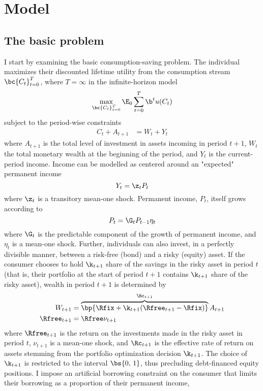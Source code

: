 \section{Model}\label{model}

\subsection{The basic problem}

I start by examining the basic consumption-saving problem. The individual maximizes their discounted lifetime utility from the consumption stream $\bc{C_{t}}_{t=0}^{T}$, where $T = \infty$ in the infinite-horizon model
\begin{equation}\label{eq:prb}
   \max_{\bc{C_t}_{t=0}^{T}}\E_{0}\sum_{t=0}^{T}\b^t u(C_t)
\end{equation}
subject to the period-wise constraints
\begin{align*}
    C_{t} + A_{t+1} &= W_{t} + Y_{t}
\end{align*}
where $A_{t+1}$ is the total level of investment in assets incoming in period $t+1$, $W_{t}$ the total monetary wealth at the beginning of the period, and $Y_{t}$ is the current-period income. Income can be modelled as centered around an "expected" permanent income
\begin{equation}\label{eq:inc}
    Y_t = \z_t P_t
\end{equation}
where $\z_t$ is a transitory mean-one shock. Permanent income, $P_t$, itself grows according to
\begin{equation}\label{eq:perm_inc}
    P_t = \G_t P_{t-1} \eta_t
\end{equation}
where $\G_t$ is the predictable component of the growth of permanent income, and $\eta_t$ is a mean-one shock. Further, individuals can also invest, in a perfectly divisible manner, between a risk-free (bond) and a risky (equity) asset. If the consumer chooses to hold $\k_{t+1}$ share of the savings in the risky asset in period $t$ (that is, their portfolio at the start of period $t+1$ contains $\k_{t+1}$ share of the risky asset), wealth in period $t+1$ is determined by
\begin{align}
    W_{t+1} &= \overbrace{\bp{\Rfix + \k_{t+1}(\Rfree_{t+1} - \Rfix)}}^{\Rc_{t+1}}A_{t+1} \label{eq:wealth}\\
    \Rfree_{t+1} &= \Rfree \nu_{t+1} \label{eq:return}
\end{align}
where $\Rfree_{t+1}$ is the return on the investments made in the risky asset in period $t$, $\nu_{t+1}$ is a mean-one shock, and $\Rc_{t+1}$ is the effective rate of return on assets stemming from the portfolio optimization decision $\k_{t+1}$. The choice of $\k_{t+1}$ is restricted to the interval $\bs{0,\,1}$, thus precluding debt-financed equity positions. I impose an artificial borrowing constraint on the consumer that limits their borrowing as a proportion of their permanent income,
